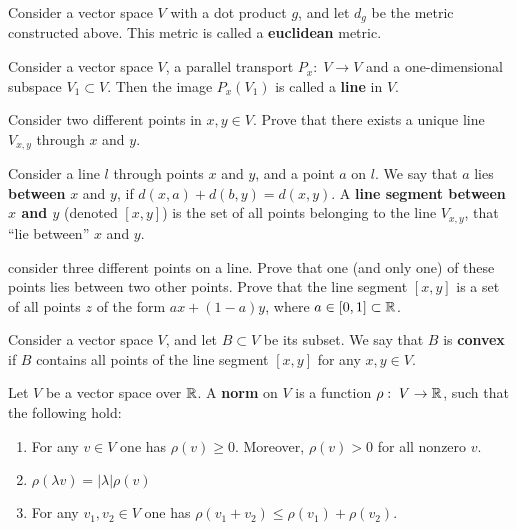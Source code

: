 \documentclass[12pt]{article}
\begin{document}
\begin{opredelenie} Consider a vector space  $V$ with a dot product
  $g$, and let $d_g$ be the metric constructed above. This metric is
  called a {\bf euclidean} metric.
\end{opredelenie}

\begin{opredelenie} Consider a vector space $V$, a parallel transport
  $P_x: \; V \to V$ and a one-dimensional subspace $V_1\subset V$.
Then the image $P_x(V_1)$ is called a {\bf line} in $V$.
\end{opredelenie}

\begin{zadacha} Consider two different points in $x, y \in V$. Prove
  that there exists a unique line $V_{x,y}$ through $x$ and $y$.
\end{zadacha}

\begin{opredelenie} Consider a line $l$ through points 
 $x$ and $y$, and a point $a$ on $l$. We say that $a$
 lies {\bf between} $x$ and $y$, if  $d(x,a)+ d(b,y)= d(x,y)$.
A {\bf line segment between $x$ and $y$} 
(denoted $[x,y]$) is the set of all points belonging to the line $V_{x,y}$,
that ``lie between'' $x$ and $y$. 
\end{opredelenie}

\begin{zadacha} consider three different points on a line. Prove that
  one (and only one) of these points lies between two other points.
Prove that the line segment $[x,y]$ is a set of all points  $z$ of the
form $a x + (1-a) y$, where $a \in [0, 1] \subset {\mathbb R}$.
\end{zadacha}

\begin{opredelenie} Consider a vector space $V$, and let $B\subset V$
  be its subset. We say that $B$ is {\bf convex} if 
$B$ contains all points of the line segment $[x,y]$
for any $x, y \in V$. 
\end{opredelenie}

\begin{opredelenie} Let $V$ be a vector space 
over ${\mathbb R}$. A {\bf norm} on $V$ is a function $\rho:\; V
\to {\mathbb R}$, such that the following hold:
\begin{enumerate}
\item For any $v\in V$ one has $\rho(v) \geq 0$. Moreover,
$\rho(v)>0$ for all nonzero $v$.

\item $\rho(\lambda v) = |\lambda| \rho(v)$

\item For any $v_1, v_2\in V$ one has $\rho(v_1+ v_2) \leq
\rho(v_1)+ \rho(v_2)$.
\end{enumerate}
\end{opredelenie}
\end{document}
